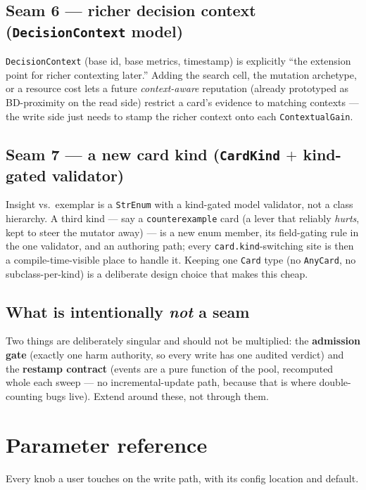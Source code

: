 \documentclass[11pt]{article}
\newcommand{\code}[1]{\texttt{\small #1}}
\begin{document}
\subsection{Seam 6 --- richer decision context (\code{DecisionContext} model)}

\code{DecisionContext} (base id, base metrics, timestamp) is explicitly ``the
extension point for richer contexting later.'' Adding the search cell, the
mutation archetype, or a resource cost lets a future \emph{context-aware}
reputation (already prototyped as BD-proximity on the read side) restrict a
card's evidence to matching contexts --- the write side just needs to stamp the
richer context onto each \code{ContextualGain}.

\subsection{Seam 7 --- a new card kind (\code{CardKind} $+$ kind-gated validator)}

Insight vs.\ exemplar is a \code{StrEnum} with a kind-gated model validator, not
a class hierarchy. A third kind --- say a \code{counterexample} card (a lever
that reliably \emph{hurts}, kept to steer the mutator away) --- is a new enum
member, its field-gating rule in the one validator, and an authoring path; every
\code{card.kind}-switching site is then a compile-time-visible place to handle
it. Keeping one \code{Card} type (no \code{AnyCard}, no subclass-per-kind) is a
deliberate design choice that makes this cheap.

\subsection{What is intentionally \emph{not} a seam}

Two things are deliberately singular and should not be multiplied: the
\textbf{admission gate} (exactly one harm authority, so every write has one
audited verdict) and the \textbf{restamp contract} (events are a pure function of
the pool, recomputed whole each sweep --- no incremental-update path, because
that is where double-counting bugs live). Extend around these, not through them.

\section{Parameter reference}
\label{sec:params}

Every knob a user touches on the write path, with its config location and
default.
\end{document}
